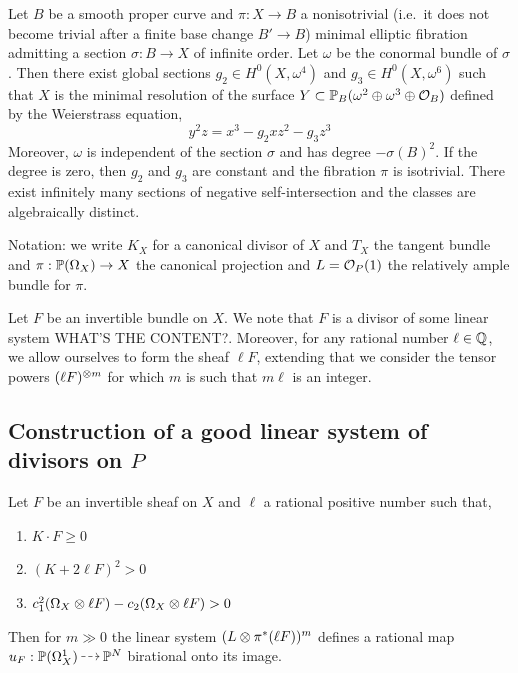 \documentclass[main.tex]{subfiles}
\begin{document}
\begin{example}
Let $B$ be a smooth proper curve and $\pi : X \to B$ a nonisotrivial (i.e.\ it does not become trivial after a finite base change $B' \to B$) minimal elliptic fibration admitting a section $\sigma : B \to X$ of infinite order. Let $\omega$ be the conormal bundle of $\sigma$. Then there exist global sections $g_2 \in H^0(X, \omega^4)$ and $g_3 \in H^0(X, \omega^6)$ such that $X$ is the minimal resolution of the surface $Y \subset \P_B(\omega^2 \oplus \omega^3 \oplus \cO_B)$ defined by the Weierstrass equation,
\[ y^2 z = x^3 - g_2 x z^2 - g_3 z^3 \]
Moreover, $\omega$ is independent of the section $\sigma$ and has degree $- \sigma(B)^2$. If the degree is zero, then $g_2$ and $g_3$ are constant and the fibration $\pi$ is isotrivial. There exist infinitely many sections of negative self-intersection and the classes are algebraically distinct.
\end{example}

Notation: we write $K_X$ for a canonical divisor of $X$ and $T_X$ the tangent bundle and $\pi : \P(\Omega_X) \to X$ the canonical projection and $L = \cO_P(1)$ the relatively ample bundle for $\pi$.
\par
Let $F$ be an invertible bundle on $X$. We note that $F$ is a divisor of some linear system {\color{red} WHAT'S THE CONTENT?}. Moreover, for any rational number $\ell \in \QQ$, we allow ourselves to form the sheaf $\ell F$, extending that we consider the tensor powers $(\ell F)^{\ot m}$ for which $m$ is such that $m \ell$ is an integer.


\subsection{Construction of a good linear system of divisors on $P$}

\begin{prop}
Let $F$ be an invertible sheaf on $X$ and $\ell$ a rational positive number such that,
\begin{enumerate}
\item $K \cdot F \ge 0$
\item $(K + 2 \ell F)^2 > 0$
\item $c_1^2(\Omega_X \ot \ell F) - c_2(\Omega_X \ot \ell F) > 0$
\end{enumerate}
Then for $m \gg 0$ the linear system $(L \ot \pi^* (\ell F))^m$ defines a rational map $u_F : \P(\Omega_X^1) \rat \P^N$ birational onto its image.
\end{prop}
\end{document}
